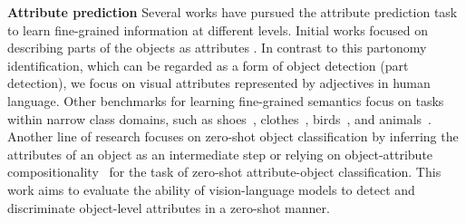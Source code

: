\documentclass[10pt,twocolumn,letterpaper]{article}
\renewcommand\paragraph[1]{\vspace{0.12cm}\noindent\textbf{#1}}
\begin{document}
\paragraph{Attribute prediction} Several works have pursued the attribute prediction task to learn fine-grained information at different levels. 
Initial works focused on describing parts of the objects as attributes \cite{5206772, NIPS2007_ed265bc9}. 
In contrast to this partonomy identification, which can be regarded as a form of object detection (part detection), we focus on visual attributes represented by adjectives in human language. 
Other benchmarks for learning fine-grained semantics \cite{StatesAndTransformations, 6909426} 
focus on tasks within narrow class domains, such as
shoes~\cite{6909426}, clothes~\cite{han2017automatic, berg2010automatic}, birds~\cite{399}, and animals~\cite{xianCVPR17}. 
Another line of research \cite{NEURIPS2020_fa2431bf, sylvain2020locality, Al-Halah_2016_CVPR} focuses on zero-shot object classification by inferring the attributes of an object as an intermediate step or relying on object-attribute compositionality~\cite{Al-Halah_2016_CVPR, chen2020learning, li2020symmetry} for the task of zero-shot attribute-object classification. 
This work aims to evaluate the ability of vision-language models to detect and discriminate object-level attributes in a zero-shot manner.
\end{document}
